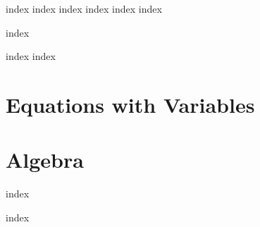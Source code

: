 \documentclass[12pt,twoside,letterpaper]{memoir}
\begin{document}
% 
\cleardoublepage


\mainmatter%


{index}
{index}
{index}
{index}
{index}
{index}

{index}

{index}
{index}






\part{Equations with Variables}



\part{Algebra}

{index}

{index}
\end{document}
